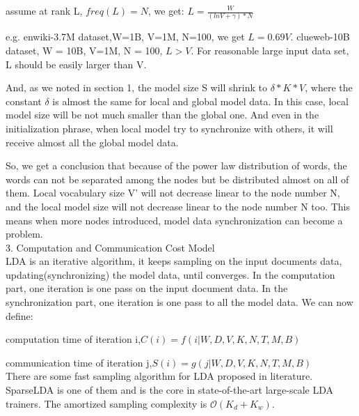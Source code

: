 assume at rank L, $freq(L) = N$, we get:
$L = \frac{W}{ (lnV + \gamma) * N}$

e.g. enwiki-3.7M dataset,W=1B, V=1M, N=100, we get $L = 0.69V$.  clueweb-10B dataset, W = 10B, V=1M, N = 100, $L > V$. For reasonable large input data set, L should be easily larger than V.

And, as we noted in section 1, the model size S will shrink to $\delta *K*V$, where the constant $\delta$ is almost the same for local and global model data. In this case, local model size will be not much smaller than the global one. And even in the initialization phrase, when local model try to synchronize with others, it will receive almost all the global model data.

So, we get a conclusion that because of the power law distribution of words, the words can not be separated among the nodes but be distributed almost on all of them. Local vocabulary size V' will not decrease linear to the node number N, and the local model size will not decrease linear to the node number N too. This means when more nodes introduced, model data synchronization can become a problem. \\

3. Computation and Communication Cost Model \\

LDA is an iterative algorithm, it keeps sampling on the input documents data, updating(synchronizing) the model data, until converges. In the computation part, one iteration is one pass on the input document data. In the synchronization part, one iteration is one pass to all the model data. We can now define:

computation time of iteration i,$C(i) = f(i| W, D, V, K, N, T, M, B)$

communication time of iteration j,$S(i) = g(j |W, D, V, K, N, T, M, B)$ \\

There are some fast sampling algorithm for LDA proposed in literature. SparseLDA is one of them and is the core in state-of-the-art large-scale LDA trainers. The amortized sampling complexity is $\mathcal{O}(K_{d}+K_{w})$. 
